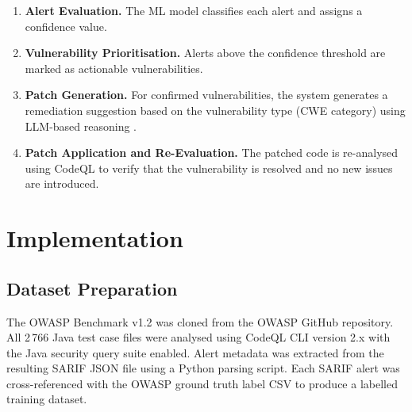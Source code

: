 \documentclass[conference]{IEEEtran}
\begin{document}
\begin{enumerate}[leftmargin=*, label=\textbf{Step \arabic*:}, itemsep=3pt]
  \item \textbf{Alert Evaluation.} The ML model classifies each alert and assigns
        a confidence value.
  \item \textbf{Vulnerability Prioritisation.} Alerts above the confidence
        threshold are marked as actionable vulnerabilities.
  \item \textbf{Patch Generation.} For confirmed vulnerabilities, the system
        generates a remediation suggestion based on the vulnerability type
        (CWE category) using LLM-based reasoning \cite{syed2025agentic}.
  \item \textbf{Patch Application and Re-Evaluation.} The patched code is
        re-analysed using CodeQL to verify that the vulnerability is resolved
        and no new issues are introduced.
\end{enumerate}

\section{Implementation}
\label{sec:implementation}

\subsection{Dataset Preparation}

The OWASP Benchmark v1.2 was cloned from the OWASP GitHub repository. All 2\,766
Java test case files were analysed using CodeQL CLI version 2.x with the Java
security query suite enabled. Alert metadata was extracted from the resulting SARIF
JSON file using a Python parsing script. Each SARIF alert was cross-referenced with
the OWASP ground truth label CSV to produce a labelled training dataset.
\end{document}
